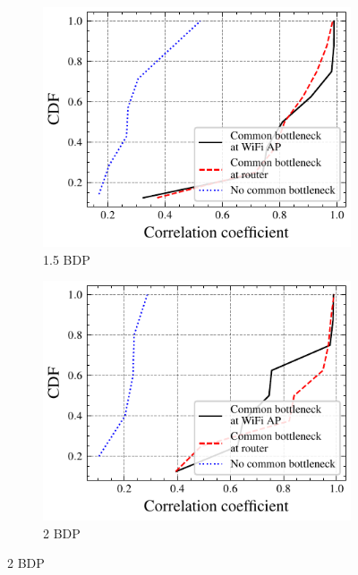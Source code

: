 \begin{figure}
  \begin{subfigure}{0.49\textwidth}
    \centering
    \includegraphics[width=\textwidth]{figures/bdp/bdp-15-no-video.pdf}
    \caption{\label{subfig:bdp-15}1.5 BDP}
  \end{subfigure}%
  \begin{subfigure}{0.49\textwidth}
    \centering
    \includegraphics[width=\textwidth]{figures/bdp/bdp-20-no-video.pdf}
    \caption{\label{subfig:bdp-20}2 BDP}
  \end{subfigure}%
\end{figure}
